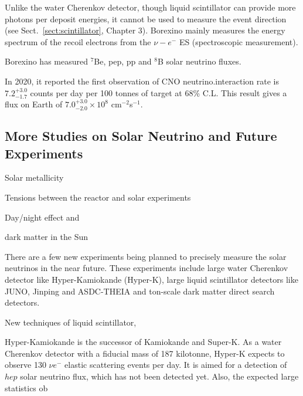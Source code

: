 Unlike the water Cherenkov detector, though liquid scintillator can provide more photons per deposit energies, it cannot be used to measure the event direction (see Sect.~\ref{sect:scintillator}, Chapter 3). Borexino mainly measures the energy spectrum of the recoil electrons from the $\nu-e^-$ ES (spectroscopic measurement).

Borexino has measured $^7$Be, pep, pp and $^8$B solar neutrino fluxes\cite{agostini2018comprehensive}. 

In 2020, it reported the first observation of CNO neutrino\cite{borexino2020experimental}.interaction rate is $7.2^{+3.0}_{-1.7}$ counts per day per 100 tonnes of target at 68\% C.L. This result gives a flux on Earth of $7.0^{+3.0}_{-2.0}\times 10^8$ cm$^{-2}$s$^{-1}$.

%

\subsection{More Studies on Solar Neutrino and Future Experiments}

Solar metallicity

Tensions between the reactor and solar experiments

Day/night effect and 

dark matter in the Sun


There are a few new experiments being planned to precisely measure the solar neutrinos in the near future. These experiments include large water Cherenkov detector like Hyper-Kamiokande (Hyper-K), large liquid scintillator detectors like JUNO, Jinping and ASDC-THEIA and ton-scale dark matter direct search detectors. 

New techniques of liquid scintillator, 

Hyper-Kamiokande is the successor of Kamiokande and Super-K. As a water Cherenkov detector with a fiducial mass of 187 kilotonne, Hyper-K expects to observe 130 $\nu e^-$ elastic scattering events per day. It is aimed for a detection of $hep$ solar neutrino flux, which has not been detected yet. Also, the expected large statistics ob

